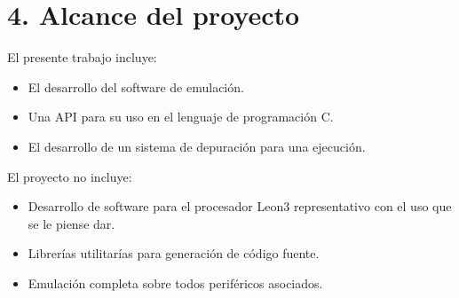 \section{4. Alcance del proyecto}
\label{sec:alcance}

El presente trabajo incluye:

\begin{itemize}
\item El desarrollo del software de emulación.
\item Una API para su uso en el lenguaje de programación C.
\item El desarrollo de un sistema de depuración para una ejecución.
\end{itemize}

El proyecto no incluye:

\begin{itemize}
\item Desarrollo de software para el procesador Leon3 representativo con el uso que se le piense dar.
\item Librerías utilitarías para generación de código fuente.
\item Emulación completa sobre todos periféricos asociados.
\end{itemize}

